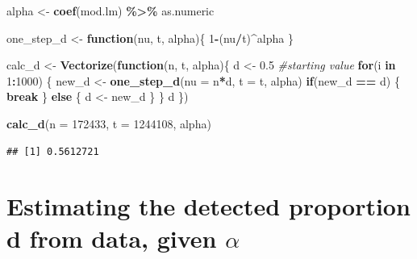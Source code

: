 \documentclass[
]{article}
\newenvironment{Shaded}{\begin{snugshade}}{\end{snugshade}}
\newcommand{\CommentTok}[1]{\textcolor[rgb]{0.56,0.35,0.01}{\textit{#1}}}
\newcommand{\ControlFlowTok}[1]{\textcolor[rgb]{0.13,0.29,0.53}{\textbf{#1}}}
\newcommand{\DataTypeTok}[1]{\textcolor[rgb]{0.13,0.29,0.53}{#1}}
\newcommand{\DecValTok}[1]{\textcolor[rgb]{0.00,0.00,0.81}{#1}}
\newcommand{\FloatTok}[1]{\textcolor[rgb]{0.00,0.00,0.81}{#1}}
\newcommand{\KeywordTok}[1]{\textcolor[rgb]{0.13,0.29,0.53}{\textbf{#1}}}
\newcommand{\NormalTok}[1]{#1}
\newcommand{\OperatorTok}[1]{\textcolor[rgb]{0.81,0.36,0.00}{\textbf{#1}}}
\newcommand{\StringTok}[1]{\textcolor[rgb]{0.31,0.60,0.02}{#1}}
\begin{document}
\begin{Shaded}
\begin{Highlighting}[]
\NormalTok{alpha \textless{}{-}}\StringTok{ }\KeywordTok{coef}\NormalTok{(mod.lm) }\OperatorTok{\%\textgreater{}\%}\StringTok{ }\NormalTok{as.numeric}
\end{Highlighting}
\end{Shaded}

\begin{Shaded}
\begin{Highlighting}[]
\NormalTok{one\_step\_d \textless{}{-}}\StringTok{ }\ControlFlowTok{function}\NormalTok{(nu, t, alpha)\{}
  \DecValTok{1}\OperatorTok{{-}}\NormalTok{(nu}\OperatorTok{/}\NormalTok{t)}\OperatorTok{\^{}}\NormalTok{alpha}
\NormalTok{\}}

\NormalTok{calc\_d \textless{}{-}}\StringTok{ }\KeywordTok{Vectorize}\NormalTok{(}\ControlFlowTok{function}\NormalTok{(n, t, alpha)\{}
\NormalTok{  d \textless{}{-}}\StringTok{ }\FloatTok{0.5} \CommentTok{\#starting value}
  \ControlFlowTok{for}\NormalTok{(i }\ControlFlowTok{in} \DecValTok{1}\OperatorTok{:}\DecValTok{1000}\NormalTok{) \{}
\NormalTok{    new\_d \textless{}{-}}\StringTok{ }\KeywordTok{one\_step\_d}\NormalTok{(}\DataTypeTok{nu =}\NormalTok{ n}\OperatorTok{*}\NormalTok{d, }\DataTypeTok{t =}\NormalTok{ t, alpha)}
    \ControlFlowTok{if}\NormalTok{(new\_d }\OperatorTok{==}\StringTok{ }\NormalTok{d) \{}
      \ControlFlowTok{break}
\NormalTok{    \} }\ControlFlowTok{else}\NormalTok{ \{}
\NormalTok{        d \textless{}{-}}\StringTok{ }\NormalTok{new\_d}
\NormalTok{      \}}
\NormalTok{  \}}
\NormalTok{  d}
\NormalTok{\})}

\KeywordTok{calc\_d}\NormalTok{(}\DataTypeTok{n =} \DecValTok{172433}\NormalTok{, }\DataTypeTok{t =} \DecValTok{1244108}\NormalTok{, alpha)}
\end{Highlighting}
\end{Shaded}

\begin{verbatim}
## [1] 0.5612721
\end{verbatim}

\hypertarget{estimating-the-detected-proportion-d-from-data-given-alpha}{%
\section{\texorpdfstring{Estimating the detected proportion d from data,
given
\(\alpha\)}{Estimating the detected proportion d from data, given \textbackslash alpha}}\label{estimating-the-detected-proportion-d-from-data-given-alpha}}
\end{document}
